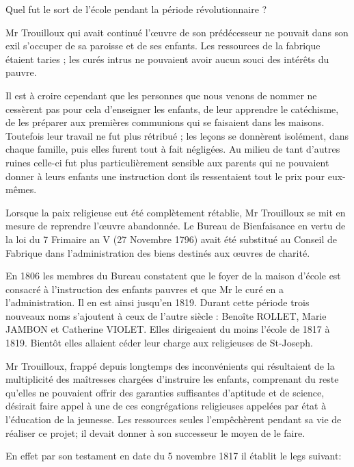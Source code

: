 Quel fut le sort de l'école pendant la période révolutionnaire ?

Mr Trouilloux qui avait continué l'œuvre de son prédécesseur ne pouvait dans son exil s'occuper de sa paroisse et de ses enfants. Les ressources de la fabrique étaient taries ; les curés intrus ne pouvaient avoir aucun souci des intérêts du pauvre.

Il est à croire cependant que les personnes que nous venons de nommer ne cessèrent pas pour cela d'enseigner les enfants, de leur apprendre le catéchisme, de les préparer aux premières communions qui se faisaient dans les maisons. Toutefois leur travail ne fut plus rétribué ; les leçons se donnèrent isolément, dans chaque famille, puis elles furent tout à fait négligées. Au milieu de tant d'autres ruines celle-ci fut plus particulièrement sensible aux parents qui ne pouvaient donner à leurs enfants une instruction dont ils ressentaient tout le prix pour eux-mêmes.

Lorsque la paix religieuse eut été complètement rétablie, Mr Trouilloux se mit en mesure de reprendre l'œuvre abandonnée. Le Bureau de Bienfaisance en vertu de la loi du 7 Frimaire an V (27 Novembre 1796) avait été substitué au Conseil de Fabrique dans l'administration des biens destinés aux œuvres de charité.

En 1806 les membres du Bureau constatent que le foyer de la maison d'école est consacré à l'instruction des enfants pauvres et que Mr le curé en a l'administration. Il en est ainsi jusqu'en 1819. Durant cette période trois nouveaux noms s'ajoutent à ceux de l'autre siècle : Benoîte ROLLET, Marie JAMBON et Catherine VIOLET. Elles dirigeaient du moins l'école de 1817 à 1819. Bientôt elles allaient céder leur charge aux religieuses de St-Joseph.

Mr Trouilloux, frappé depuis longtemps des inconvénients qui résultaient de la multiplicité des maîtresses chargées d'instruire les enfants, comprenant du reste qu'elles ne pouvaient offrir des garanties suffisantes d'aptitude et de science, désirait faire appel à une
de ces congrégations religieuses appelées par état à l'éducation de la jeunesse. Les ressources seules l'empêchèrent pendant sa vie de réaliser ce projet; il devait donner à son successeur le moyen de le faire.

En effet par son testament en date du 5 novembre 1817 il établit le legs suivant:

